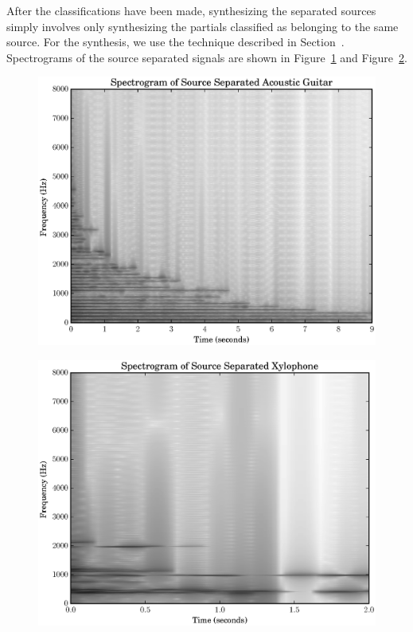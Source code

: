 \documentclass[letterpaper,12pt]{report}
\begin{document}
After the classifications have been made, synthesizing the separated sources
simply involves only synthesizing the partials classified as belonging to the
same source. For the synthesis, we use the technique described in
Section~\label{sec:cubicphasepoly}. Spectrograms of the source separated signals
are shown in Figure~\ref{plot:acgtra3specgramss} and
Figure~\ref{plot:xylofs4specgramss}. 

\begin{figure}
    \includegraphics[width=\textwidth]{plots/ac_gtr_ss_spec.eps}
    \caption{\label{plot:acgtra3specgramss}}
\end{figure}

\begin{figure}
    \includegraphics[width=\textwidth]{plots/xylo_ss_spec.eps}
    \caption{\label{plot:xylofs4specgramss}}
\end{figure}
\end{document}
